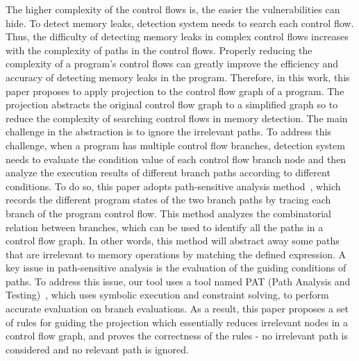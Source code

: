  
The higher complexity of the control flows is, the easier the vulnerabilities can hide. To detect memory leaks, detection system needs to search each control flow. Thus, the difficulty of detecting memory leaks in complex control flows increases with the complexity of paths in the control flows. Properly reducing the complexity of a program’s control flows can greatly improve the efficiency and accuracy of detecting memory leaks in the program. Therefore, in this work, this paper proposes to apply projection to the control flow graph of a program. The projection abstracts the original control flow graph to a simplified graph so to reduce the complexity of searching control flows in memory detection. The main challenge in the abstraction is to ignore the irrelevant paths. To address this challenge, when a program has multiple control flow branches, detection system needs to evaluate the condition value of each control flow branch node and then analyze the execution results of different branch paths according to different conditions. To do so, this paper adopts path-sensitive analysis method~\cite{XA05}, which records the different program states of the two branch paths by tracing each branch of the program control flow. This method analyzes the combinatorial relation between branches, which can be used to identify all the paths in a control flow graph. In other words, this method will abstract away some paths that are irrelevant to memory operations by matching the defined expression. A key issue in path-sensitive analysis is the evaluation of the guiding conditions of paths. To address this issue, our tool uses a tool named PAT (Path Analysis and Testing)~\cite{H87}, which uses symbolic execution and constraint solving, to perform accurate evaluation on branch evaluations. %
As a result, this paper proposes a set of rules for guiding the projection which essentially reduces irrelevant nodes in a control flow graph, and proves the correctness of the rules -  no irrelevant path is considered and no relevant path is ignored.


